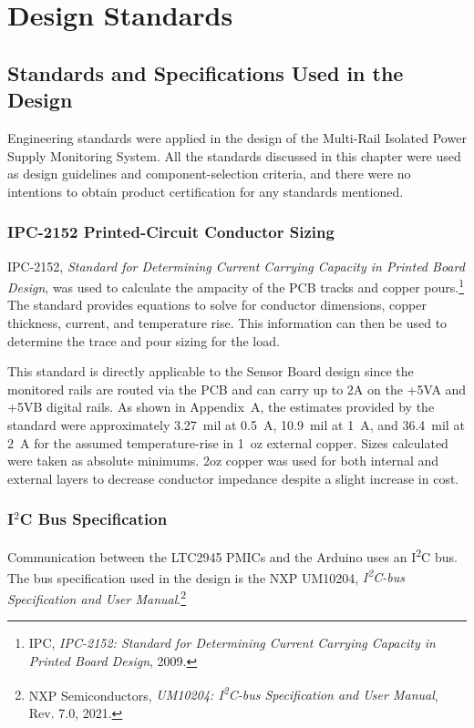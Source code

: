 \chapter{Design Standards}
\label{ch:design-standards}

\section{Standards and Specifications Used in the Design}

Engineering standards were applied in the design of the Multi-Rail Isolated Power Supply Monitoring System. All the standards discussed in this chapter were used as design guidelines and component-selection criteria, and there were no intentions to obtain product certification for any standards mentioned.

\subsection{IPC-2152 Printed-Circuit Conductor Sizing}

IPC-2152, \textit{Standard for Determining Current Carrying Capacity in Printed
    Board Design}, was used to calculate the ampacity of the
PCB tracks and copper pours.\footnote{IPC, \textit{IPC-2152: Standard for
        Determining Current Carrying Capacity in Printed Board Design}, 2009.}
The standard provides equations to solve for conductor dimensions, copper thickness, current, and
temperature rise. This information can then be used to determine the trace and pour sizing for the load.

This standard is directly applicable to the Sensor Board design since the monitored rails are
routed via the PCB and can carry up to 2A on the +5VA and +5VB digital rails.
As shown in Appendix~A, the estimates provided by the standard were approximately 3.27~mil at 0.5~A, 10.9~mil at 1~A, and 36.4~mil at 2~A for
the assumed temperature-rise in 1~oz external copper. Sizes calculated were taken as absolute minimums. 2oz copper was used for both internal and external layers to decrease conductor impedance despite a slight increase in cost.


\subsection{I\texorpdfstring{$^2$}{2}C Bus Specification}

Communication between the LTC2945 PMICs and the Arduino uses an I\textsuperscript{2}C bus. The bus specification used in the design is the NXP UM10204, \textit{I\textsuperscript{2}C-bus Specification and User Manual}.\footnote{NXP Semiconductors, \textit{UM10204: I\textsuperscript{2}C-bus Specification and User Manual}, Rev. 7.0, 2021.}

